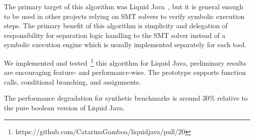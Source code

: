 \documentclass[sigplan,screen,review]{acmart}
\begin{document}
The primary target of this algorithm was Liquid Java~\cite{gamboa2021user}, but it is general enough to be used in other projects relying on SMT solvers to verify symbolic execution steps. The primary benefit of this algorithm is simplicity and delegation of responsibility for separation logic handling to the SMT solver instead of a symbolic execution engine which is usually implemented separately for each tool. 

We implemented and tested~\footnote{https://github.com/CatarinaGamboa/liquidjava/pull/20} this algorithm for Liquid Java, preliminary results are encouraging feature- and performance-wise. The prototype supports function calls, conditional branching, and assignments.

The performance degradation for synthetic benchmarks is around 30\% relative to the pure boolean version of Liquid Java.



\end{document}
